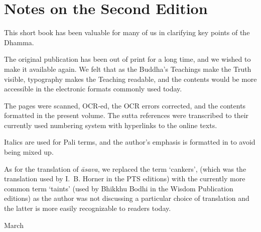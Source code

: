 \chapter{Notes on the Second Edition}

This short book has been valuable for many of us in clarifying key points of the Dhamma.

The original publication has been out of print for a long time, and we wished to make it available again.
We felt that as the Buddha's Teachings make the Truth visible, typography makes the Teaching readable,
and the contents would be more accessible in the electronic formats commonly used today.

The pages were scanned, OCR-ed, the OCR errors corrected, and the contents formatted in the present volume.
The sutta references were transcribed to their currently used numbering system with hyperlinks to the online texts.

Italics are used for Pali terms, and the author's emphasis is formatted in  to avoid being mixed up.

As for the translation of \emph{āsava}, we replaced the term `cankers',
(which was the translation used by I.~B. Horner in the PTS editions)
with the currently more common term `taints'
(used by Bhikkhu Bodhi in the Wisdom Publication editions)
as the author was not discussing a particular choice of translation
and the latter is more easily recognizable to readers today.

\bigskip

{ March
\par}
